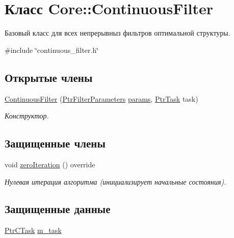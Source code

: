 \hypertarget{class_core_1_1_continuous_filter}{}\section{Класс Core\+:\+:Continuous\+Filter}
\label{class_core_1_1_continuous_filter}


Базовый класс для всех непрерывныз фильтров оптимальной структуры.  




{\ttfamily \#include \char`\"{}continuous\+\_\+filter.\+h\char`\"{}}

\subsection*{Открытые члены}
\begin{DoxyCompactItemize}
\item 
\hyperlink{class_core_1_1_continuous_filter_a5f28c1f5aaf740be3a6a8af09c0fcc22}{Continuous\+Filter} (\hyperlink{namespace_core_a4811af8148ba137d644b9a61a042cf03}{Ptr\+Filter\+Parameters} \hyperlink{class_core_1_1_filter_a44aa749b49ba46256975ce545531ecf7}{params}, \hyperlink{namespace_core_abfda8f69fcacfcea2696549b548ed737}{Ptr\+Task} task)\hypertarget{class_core_1_1_continuous_filter_a5f28c1f5aaf740be3a6a8af09c0fcc22}{}\label{class_core_1_1_continuous_filter_a5f28c1f5aaf740be3a6a8af09c0fcc22}

\begin{DoxyCompactList}\small\item\em Конструктор. \end{DoxyCompactList}\end{DoxyCompactItemize}
\subsection*{Защищенные члены}
\begin{DoxyCompactItemize}
\item 
void \hyperlink{class_core_1_1_continuous_filter_a4c30983f9354344717538f807855f2ae}{zero\+Iteration} () override
\begin{DoxyCompactList}\small\item\em Нулевая итерация алгоритма (инициализирует начальные состояния). \end{DoxyCompactList}\end{DoxyCompactItemize}
\subsection*{Защищенные данные}
\begin{DoxyCompactItemize}
\item 
\hyperlink{namespace_core_a95543587a560c6c497c6cadf68e03a62}{Ptr\+C\+Task} \hyperlink{class_core_1_1_continuous_filter_aaea7d47a9d573b9a88007780c4c3a722}{m\+\_\+task}
\end{DoxyCompactItemize}


